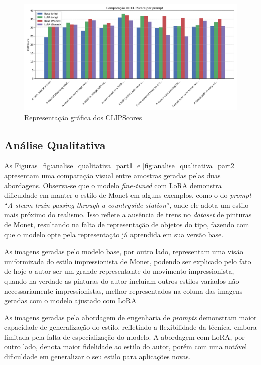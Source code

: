 \begin{figure}
    \centering
    \includegraphics[width=1\linewidth]{clipscore_comparacao.png}
    \caption{Representação gráfica dos CLIPScores}
    \label{fig:clipscore}
\end{figure}

\subsection{Análise Qualitativa}

As Figuras~\ref{fig:analise_qualitativa_part1} e \ref{fig:analise_qualitativa_part2} apresentam uma comparação visual entre amostras geradas pelas duas abordagens. Observa-se que o modelo \textit{fine-tuned} com LoRA demonstra dificuldade em manter o estilo de Monet em alguns exemplos, como o do \textit{prompt} ``\textit{A steam train passing through a countryside station}'', onde ele adota um estilo mais próximo do realismo. Isso reflete a ausência de trens no \textit{dataset} de pinturas de Monet, resultando na falta de representação de objetos do tipo, fazendo com que o modelo opte pela representação já aprendida em sua versão base.

As imagens geradas pelo modelo base, por outro lado, representam uma visão uniformizada do estilo impressionista de Monet, podendo ser explicado pelo fato de hoje o autor ser um grande representante do movimento impressionista, quando na verdade as pinturas do autor incluíam outros estilos variados não necessariamente impressionistas, melhor representados na coluna das imagens geradas com o modelo ajustado com LoRA

As imagens geradas pela abordagem de engenharia de \textit{prompts} demonstram maior capacidade de generalização do estilo, refletindo a flexibilidade da técnica, embora limitada pela falta de especialização do modelo. A abordagem com LoRA, por outro lado, denota maior fidelidade ao estilo do autor, porém com uma notável dificuldade em generalizar o seu estilo para aplicações novas.

